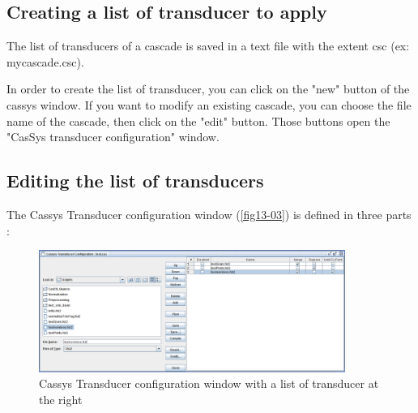 \subsection{Creating a list of transducer to apply}
\label{subsec:listTrans}

The list of transducers of a cascade is saved in a text file with the extent csc (ex: mycascade.csc).

\bigskip
\noindent In order to create the list of transducer, you can click on the "new" button of the cassys window. 
If you want to modify an existing cascade, you can choose the file name of the cascade, then click on the "edit" button. 
Those buttons open the "CasSys transducer configuration" window.

\subsection{Editing the list of transducers}
\label{subsec:editlistTrans}

The Cassys Transducer configuration window (\ref{fig13-03}) is defined in three parts :

\begin{figure}[!htb]
  \centering
  \includegraphics[width=10cm]{resources/img/fig13-03.png}
  \caption{Cassys Transducer configuration window with a list of transducer at the right}
  \label{fig:fig13-03}
\end{figure}

